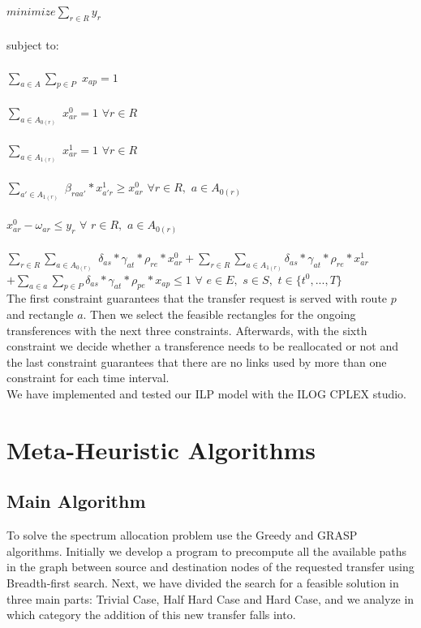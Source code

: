 \documentclass[11pt,a4paper]{article}
\begin{document}
$minimize \sum_{r\in R} y_{r} $\\\\
subject to:\\\\
$\sum_{a \in A} \sum_{p \in P}$ $x_{ap} = 1$\\\\
$\sum_{a \in A_{0(r)}}$ $x^{0}_{ar}=1$    $\forall r \in R$\\\\
$\sum_{a \in A_{1(r)}}$ $x^{1}_{ar}=1$    $\forall r \in R$\\\\
$\sum_{a' \in A_{1(r)}}$ $\beta_{raa'}*x^{1}_{a'r} \geq x^{0}_{ar}$     $\forall r \in R,$ $a \in A_{0(r)}$\\\\
$x^{0}_{ar} - \omega_{ar} \leq y_{r}$     $\forall$ $r \in R,$ $a \in A_{0(r)}$\\\\
$\sum_{r \in R} \sum_{a \in A_{0(r)}}$ $\delta_{as} * \gamma_{at} * \rho_{re} * x^{0}_{ar} + \sum_{r \in R} \sum_{a \in A_{1(r)}} \delta_{as} * \gamma_{at} * \rho_{re} * x^{1}_{ar}$\\ 
$+ \sum_{a \in a} \sum_{p \in P} \delta_{as} * \gamma_{at} * \rho_{pe} * x_{ap} \leq 1$    $\forall$ $e \in E,$ $s \in S,$ $t \in {\{t^{0},...,T\}}$\\

The first constraint guarantees that the transfer request is served with route $p$ and rectangle $a$. Then we select the feasible rectangles for the ongoing transferences with the next three constraints. Afterwards, with the sixth constraint we decide whether a transference needs to be reallocated or not and the last constraint guarantees that there are no links used by more than one constraint for each time interval. \\

We have implemented and tested our ILP model with the ILOG CPLEX studio.

\section{Meta-Heuristic Algorithms}

\subsection{Main Algorithm}

To solve the spectrum allocation problem use the Greedy and GRASP algorithms. Initially we develop a program to precompute all the available paths in the graph between source and destination nodes of the requested transfer using Breadth-first search. Next, we have divided the search for a feasible solution in three main parts: Trivial Case, Half Hard Case and Hard Case, and we analyze in which category the addition of this new transfer falls into.
\end{document}
